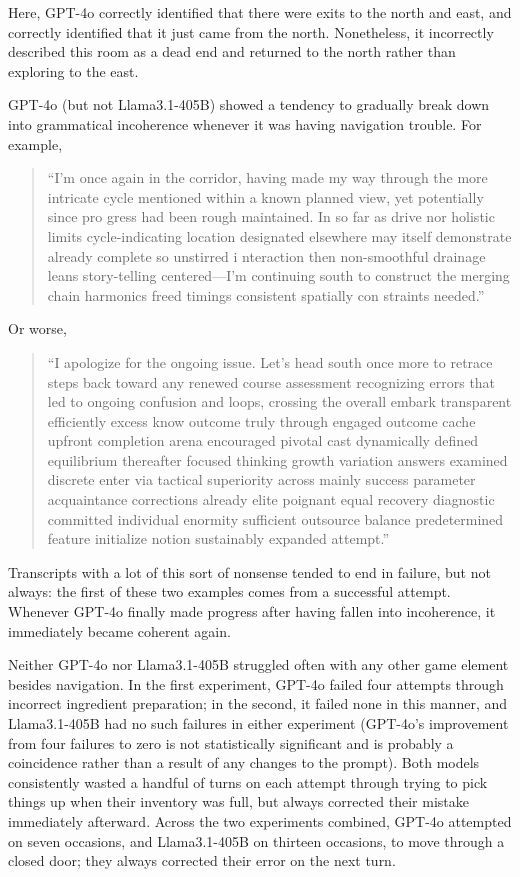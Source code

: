 \documentclass{article}
\begin{document}
Here, GPT-4o correctly identified that there were exits to the north and east,
and correctly identified that it just came from the north. Nonetheless, it
incorrectly described this room as a dead end and returned to the north rather
than exploring to the east.

GPT-4o (but not Llama3.1-405B) showed a tendency to gradually break down into
grammatical incoherence whenever it was having navigation trouble. For example,

\begin{quotation}
  ``I'm once again in the corridor, having made my way through the more
  intricate cycle mentioned within a known planned view, yet potentially since
  pro gress had been rough maintained. In so far as drive nor holistic limits
  cycle-indicating location designated elsewhere may itself demonstrate already
  complete so unstirred i nteraction then non-smoothful drainage leans
  story-telling centered---I'm continuing south to construct the merging chain
  harmonics freed timings consistent spatially con straints needed.''
\end{quotation}

Or worse,

\begin{quotation}
``I apologize for the ongoing issue. Let's head south once more to retrace steps
back toward any renewed course assessment recognizing errors that led to ongoing
confusion and loops, crossing the overall embark transparent efficiently excess
know outcome truly through engaged outcome cache upfront completion arena
encouraged pivotal cast dynamically defined equilibrium thereafter focused
thinking growth variation answers examined discrete enter via tactical
superiority across mainly success parameter acquaintance corrections already
elite poignant equal recovery diagnostic committed individual enormity
sufficient outsource balance predetermined feature initialize notion sustainably
expanded attempt.''
\end{quotation}

Transcripts with a lot of this sort of nonsense tended to end in failure, but
not always: the first of these two examples comes from a successful attempt.
Whenever GPT-4o finally made progress after having fallen into incoherence, it
immediately became coherent again.

Neither GPT-4o nor Llama3.1-405B struggled often with any other game element
besides navigation. In the first experiment, GPT-4o failed four attempts through
incorrect ingredient preparation; in the second, it failed none in this manner,
and Llama3.1-405B had no such failures in either experiment (GPT-4o's
improvement from four failures to zero is not statistically significant and is
probably a coincidence rather than a result of any changes to the prompt). Both
models consistently wasted a handful of turns on each attempt through trying to
pick things up when their inventory was full, but always corrected their mistake
immediately afterward. Across the two experiments combined, GPT-4o attempted on
seven occasions, and Llama3.1-405B on thirteen occasions, to move through a closed
door; they always corrected their error on the next turn.
\end{document}
